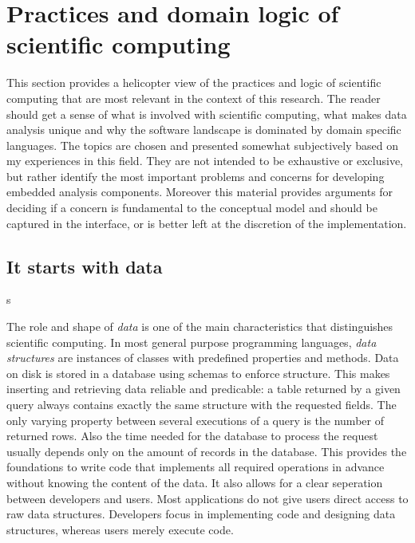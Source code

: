 
\section{Practices and domain logic of scientific computing}


This section provides a helicopter view of the practices and logic of scientific computing that are most relevant in the context of this research. The reader should get a sense of what is involved with scientific computing, what makes data analysis unique and why the software landscape is dominated by domain specific languages. The topics are chosen and presented somewhat subjectively based on my experiences in this field. They are not intended to be exhaustive or exclusive, but rather identify the most important problems and concerns for developing embedded analysis components. Moreover this material provides arguments for deciding if a concern is fundamental to the conceptual model and should be captured in the interface, or is better left at the discretion of the implementation.

\subsection{It starts with data}s

The role and shape of \emph{data} is one of the main characteristics that distinguishes scientific computing. In most general purpose programming languages, \emph{data structures} are instances of classes with predefined properties and methods. Data on disk is stored in a database using schemas to enforce structure. This makes inserting and retrieving data reliable and predicable: a table returned by a given \SQL query always contains exactly the same structure with the requested fields. The only varying property between several executions of a query is the number of returned rows. Also the time needed for the database to process the request usually depends only on the amount of records in the database. This provides the foundations to write code that implements all required operations in advance without knowing the content of the data. It also allows for a clear seperation between developers and users. Most applications do not give users direct access to raw data structures. Developers focus in implementing code and designing data structures, whereas users merely execute code.

